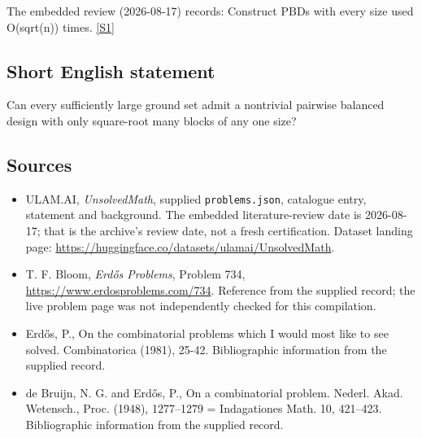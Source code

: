 \documentclass[11pt,a4paper]{article}
\newcommand{\sref}[2]{\hyperlink{source:#1:#2}{[S#2]}}
\begin{document}
The embedded review (2026-08-17) records: Construct PBDs with every size used O(sqrt(n)) times. \sref{statement}{1}

\subsection{Short English statement}

Can every sufficiently large ground set admit a nontrivial pairwise balanced design with only square-root many blocks of any one size?

\subsection{Sources}

{\small

\begin{itemize}

\item[\hypertarget{source:statement:1}{S1}] ULAM.AI, \emph{UnsolvedMath}, supplied \texttt{problems.json}, catalogue entry, statement and background. The embedded literature-review date is 2026-08-17; that is the archive’s review date, not a fresh certification. Dataset landing page: \url{https://huggingface.co/datasets/ulamai/UnsolvedMath}.

\item[\hypertarget{source:statement:2}{S2}] T. F. Bloom, \emph{Erdős Problems}, Problem 734, \url{https://www.erdosproblems.com/734}. Reference from the supplied record; the live problem page was not independently checked for this compilation.

\item[\hypertarget{source:statement:3}{S3}] Erd\H{o}s, P., On the combinatorial problems which I would most like to see solved. Combinatorica (1981), 25-42. Bibliographic information from the supplied record.

\item[\hypertarget{source:statement:4}{S4}] de Bruijn, N. G. and Erd\H{o}s, P., On a combinatorial problem. Nederl. Akad. Wetensch., Proc. (1948), 1277--1279 = Indagationes Math. 10, 421--423. Bibliographic information from the supplied record.

\end{itemize}

}

\label{end:statement}
\end{document}
